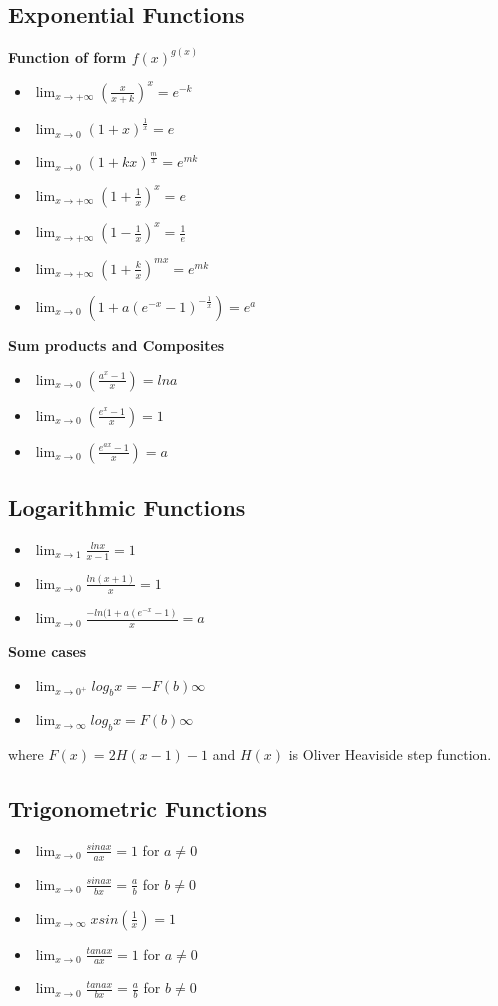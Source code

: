 \documentclass[twocolumn, 10pt]{article}
\begin{document}
\subsection{Exponential Functions}
\textbf{Function of form $f(x)^{g(x)}$}
\begin{itemize}
\item $\lim_{x \to + \infty} (\frac{x}{x+k})^x=e^{-k}$
\item $\lim_{x \to 0} (1+x)^\frac{1}{x}=e$
\item $\lim_{x \to 0} (1+kx)^\frac{m}{x}=e^{mk}$
\item $\lim_{x \to + \infty} (1+ \frac{1}{x})^x=e$
\item $\lim_{x \to + \infty} (1- \frac{1}{x})^x=\frac{1}{e}$
\item $\lim_{x \to + \infty} (1+ \frac{k}{x})^{mx}=e^{mk}$
\item $\lim_{x \to 0} (1+ a(e^{-x}-1)^{- \frac{1}{x}})=e^a$
\end{itemize}
\textbf{Sum products and Composites}
\begin{itemize}
\item $\lim_{x \to 0} (\frac{a^x -1}{x})=lna$
\item $\lim_{x \to 0} (\frac{e^x -1}{x})=1$
\item $\lim_{x \to 0} (\frac{e^{ax}-1}{x})=a$
\end{itemize}
\subsection{Logarithmic Functions}
\begin{itemize}
\item $\lim_{x \to 1} \frac{lnx}{x-1}=1$
\item $\lim_{x \to 0} \frac{ln(x+1)}{x}=1$
\item $\lim_{x \to 0} \frac{-ln(1+a(e^{-x}-1)}{x}=a$
\end{itemize}
\textbf{Some cases}
\begin{itemize}
\item $\lim_{x \to 0^+} log_b x=-F(b) \infty$
\item $\lim_{x \to \infty} log_b x=F(b) \infty$
\end{itemize}
where $F(x)=2H(x-1)-1$ and $H(x)$ is Oliver Heaviside step function.
\subsection{Trigonometric Functions}
\begin{itemize}
\item $\lim_{x \to 0} \frac{sinax}{ax}=1 $ for $a \not= 0$
\item $\lim_{x \to 0} \frac{sinax}{bx}=\frac{a}{b} $ for $b \not= 0$
\item $\lim_{x \to \infty} xsin( \frac{1}{x})=1$
\item $\lim_{x \to 0} \frac{tanax}{ax}=1 $ for $a \not= 0$ 
\item $\lim_{x \to 0} \frac{tanax}{bx}=\frac{a}{b} $ for $b \not= 0$
\end{itemize}
\end{document}
